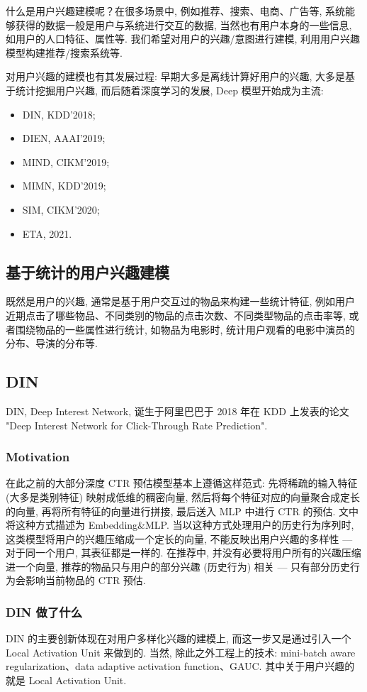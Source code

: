 什么是用户兴趣建模呢？在很多场景中, 例如推荐、搜索、电商、广告等, 系统能够获得的数据一般是用户与系统进行交互的数据, 当然也有用户本身的一些信息, 如用户的人口特征、属性等. 我们希望对用户的兴趣/意图进行建模, 利用用户兴趣模型构建推荐/搜索系统等. 

对用户兴趣的建模也有其发展过程: 早期大多是离线计算好用户的兴趣, 大多是基于统计挖掘用户兴趣, 而后随着深度学习的发展, Deep 模型开始成为主流: 
\begin{itemize}
	\item DIN, KDD'2018; 
	\item DIEN, AAAI'2019; 
	\item MIND, CIKM'2019;
	\item MIMN, KDD'2019;
	\item SIM, CIKM'2020;
	\item ETA, 2021.
\end{itemize}


\subsection{基于统计的用户兴趣建模}
既然是用户的兴趣, 通常是基于用户交互过的物品来构建一些统计特征, 例如用户近期点击了哪些物品、不同类别的物品的点击次数、不同类型物品的点击率等, 或者围绕物品的一些属性进行统计, 如物品为电影时, 统计用户观看的电影中演员的分布、导演的分布等. 

\subsection{DIN}
DIN, Deep Interest Network, 诞生于阿里巴巴于 2018 年在 KDD 上发表的论文 "Deep Interest Network for Click-Through Rate Prediction". 

\subsubsection{Motivation}
在此之前的大部分深度 CTR 预估模型基本上遵循这样范式: 先将稀疏的输入特征 (大多是类别特征) 映射成低维的稠密向量, 然后将每个特征对应的向量聚合成定长的向量, 再将所有特征的向量进行拼接, 最后送入 MLP 中进行 CTR 的预估. 文中将这种方式描述为 Embedding\&MLP. 当以这种方式处理用户的历史行为序列时, 这类模型将用户的兴趣压缩成一个定长的向量, 不能反映出用户兴趣的多样性 --- 对于同一个用户, 其表征都是一样的. 在推荐中, 并没有必要将用户所有的兴趣压缩进一个向量, 推荐的物品只与用户的部分兴趣 (历史行为) 相关 --- 只有部分历史行为会影响当前物品的 CTR 预估. 

\subsubsection{DIN 做了什么}
DIN 的主要创新体现在对用户多样化兴趣的建模上, 而这一步又是通过引入一个 Local Activation Unit 来做到的. 当然, 除此之外工程上的技术: mini-batch aware regularization、data adaptive activation function、GAUC. 其中关于用户兴趣的就是 Local Activation Unit. 

